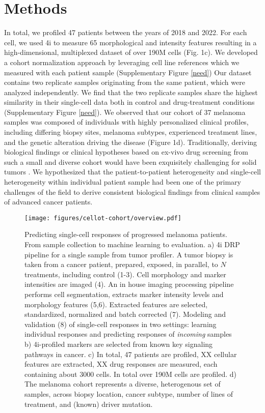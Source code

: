 \section{Methods}

In total, we profiled 47 patients between the years of 2018 and 2022.
For each cell, we used 4i to measure 65 morphological and intensity features resulting in a high-dimensional, multiplexed dataset of over 190M cells (Fig. 1c).
We developed a cohort normalization approach by leveraging cell line references which we measured with each patient sample (Supplementary Figure \ref{need})
Our dataset contains two replicate samples originating from the same patient, which were analyzed independently.
We find that the two replicate samples share the highest similarity in their single-cell data both in control and drug-treatment conditions (Supplementary Figure \ref{need}).
We observed that our cohort of 37 melanoma samples was composed of individuals with highly personalized clinical profiles, including differing biopsy sites, melanoma subtypes, experienced treatment lines, and the genetic alteration driving the disease (Figure 1d). 
Traditionally, deriving biological findings or clinical hypotheses based on ex-vivo drug screening from such a small and diverse cohort would have been exquisitely challenging for solid tumors \cite{williams2022}.
We hypothesized that the patient-to-patient heterogeneity and single-cell heterogeneity within individual patient sample had been one of the primary challenges of the field to derive consistent biological findings from clinical samples of advanced cancer patients.

\begin{figure}[h!]
  \label{cellot-cohort-overview}
  \centering
  \texttt{[image: figures/cellot-cohort/overview.pdf]}
  \caption{
    Predicting single-cell responses of progressed melanoma patients.
    From sample collection to machine learning to evaluation.
    a) 4i DRP pipeline for a single sample from tumor profiler.
    A tumor biopsy is taken from a cancer patient, prepared,
    exposed, in parallel, to $N$ treatments, including control (1-3).
    Cell morphology and marker intensities are imaged (4).
    An in house imaging processing pipeline performs cell segmentation,
    extracts marker intensity levels and morphology features (5,6).
    Extracted features are selected, standardized, normalized and batch corrected (7).
    Modeling and validation (8) of single-cell responses in two settings: learning individual responses and predicting responses of \emph{incoming} samples
    b) 4i-profiled markers are selected from known key signaling pathways in cancer.
    c) In total, 47 patients are profiled, XX cellular features are extracted, XX drug responses are measured, each containing about 3000 cells. In total over 190M cells are profiled.
    d) The melanoma cohort represents a diverse, heterogenous set of samples,
    across biopsy location, cancer subtype, number of lines of treatment, and (known) driver mutation.
  }
\end{figure}

